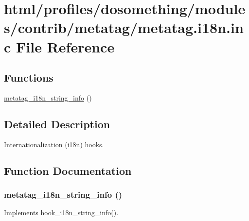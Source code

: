 \hypertarget{metatag_8i18n_8inc}{
\section{html/profiles/dosomething/modules/contrib/metatag/metatag.i18n.inc File Reference}
\label{metatag_8i18n_8inc}
}
\subsection*{Functions}
\begin{DoxyCompactItemize}
\item 
\hyperlink{metatag_8i18n_8inc_ad154ce5d93e5f3eb4734e97c901ceb22}{metatag\_\-i18n\_\-string\_\-info} ()
\end{DoxyCompactItemize}


\subsection{Detailed Description}
Internationalization (i18n) hooks. 

\subsection{Function Documentation}
\hypertarget{metatag_8i18n_8inc_ad154ce5d93e5f3eb4734e97c901ceb22}{
\subsubsection[{metatag\_\-i18n\_\-string\_\-info}]{\setlength{\rightskip}{0pt plus 5cm}metatag\_\-i18n\_\-string\_\-info ()}}
\label{metatag_8i18n_8inc_ad154ce5d93e5f3eb4734e97c901ceb22}
Implements hook\_\-i18n\_\-string\_\-info(). 